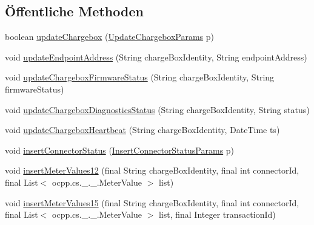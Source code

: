 \subsection*{Öffentliche Methoden}
\begin{DoxyCompactItemize}
\item 
boolean \hyperlink{classde_1_1rwth_1_1idsg_1_1steve_1_1repository_1_1impl_1_1_ocpp_server_repository_impl_a8a6af4bdd226d03394906cbe1ee26431}{update\-Chargebox} (\hyperlink{classde_1_1rwth_1_1idsg_1_1steve_1_1repository_1_1dto_1_1_update_chargebox_params}{Update\-Chargebox\-Params} p)
\item 
void \hyperlink{classde_1_1rwth_1_1idsg_1_1steve_1_1repository_1_1impl_1_1_ocpp_server_repository_impl_a4bab9da9bfcb1394161a9d5b50859881}{update\-Endpoint\-Address} (String charge\-Box\-Identity, String endpoint\-Address)
\item 
void \hyperlink{classde_1_1rwth_1_1idsg_1_1steve_1_1repository_1_1impl_1_1_ocpp_server_repository_impl_a01bd5b6f34c5de868fd8e2f57ac18b5d}{update\-Chargebox\-Firmware\-Status} (String charge\-Box\-Identity, String firmware\-Status)
\item 
void \hyperlink{classde_1_1rwth_1_1idsg_1_1steve_1_1repository_1_1impl_1_1_ocpp_server_repository_impl_ae09274da510b22df794c2e4fe168ae0b}{update\-Chargebox\-Diagnostics\-Status} (String charge\-Box\-Identity, String status)
\item 
void \hyperlink{classde_1_1rwth_1_1idsg_1_1steve_1_1repository_1_1impl_1_1_ocpp_server_repository_impl_a30a2fc673e5c7c67009447de462188b2}{update\-Chargebox\-Heartbeat} (String charge\-Box\-Identity, Date\-Time ts)
\item 
void \hyperlink{classde_1_1rwth_1_1idsg_1_1steve_1_1repository_1_1impl_1_1_ocpp_server_repository_impl_ad53e1987f311f7f3de83a21c41980ae5}{insert\-Connector\-Status} (\hyperlink{classde_1_1rwth_1_1idsg_1_1steve_1_1repository_1_1dto_1_1_insert_connector_status_params}{Insert\-Connector\-Status\-Params} p)
\item 
void \hyperlink{classde_1_1rwth_1_1idsg_1_1steve_1_1repository_1_1impl_1_1_ocpp_server_repository_impl_aa077567a348b5c128c27dfe868fa937b}{insert\-Meter\-Values12} (final String charge\-Box\-Identity, final int connector\-Id, final List$<$ ocpp.\-cs.\-\_.\-\_.\-Meter\-Value $>$ list)
\item 
void \hyperlink{classde_1_1rwth_1_1idsg_1_1steve_1_1repository_1_1impl_1_1_ocpp_server_repository_impl_a5b59717a6129594b353d8ef93818156b}{insert\-Meter\-Values15} (final String charge\-Box\-Identity, final int connector\-Id, final List$<$ ocpp.\-cs.\-\_.\-\_.\-Meter\-Value $>$ list, final Integer transaction\-Id)

\end{DoxyCompactItemize}
